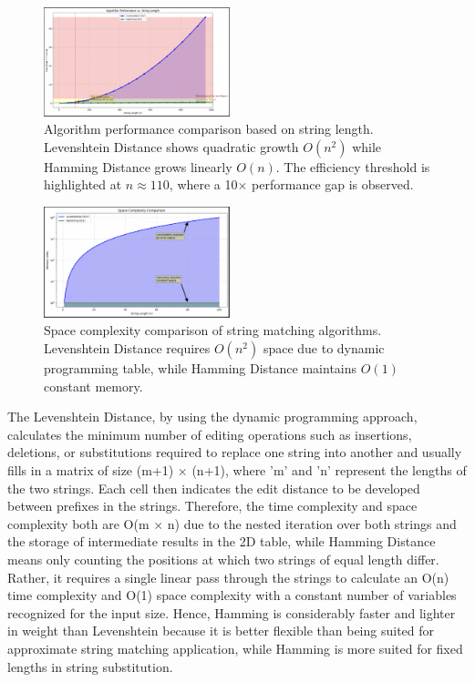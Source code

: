 \documentclass[conference]{IEEEtran}
\begin{document}
\begin{figure}[htbp]
\centering
\includegraphics[width=0.48\textwidth]{performance_graph.png}
\caption{Algorithm performance comparison based on string length. Levenshtein Distance shows quadratic growth $O(n^2)$ while Hamming Distance grows linearly $O(n)$. The efficiency threshold is highlighted at $n \approx 110$, where a 10× performance gap is observed.}
\label{fig:performance-comparison}
\end{figure}

\begin{figure}[htbp]
\centering
\includegraphics[width=0.48\textwidth]{space_complexity.png}
\caption{Space complexity comparison of string matching algorithms. Levenshtein Distance requires $O(n^2)$ space due to dynamic programming table, while Hamming Distance maintains $O(1)$ constant memory.}
\label{fig:space-comparison}
\end{figure}


The Levenshtein Distance, by using the dynamic programming approach, calculates the minimum number of editing operations such as insertions, deletions, or substitutions required to replace one string into another and usually fills in a matrix of size (m+1) × (n+1), where 'm' and 'n' represent the lengths of the two strings. Each cell then indicates the edit distance to be developed between prefixes in the strings. Therefore, the time complexity and space complexity both are O(m × n) due to the nested iteration over both strings and the storage of intermediate results in the 2D table, while Hamming Distance means only counting the positions at which two strings of equal length differ. Rather, it requires a single linear pass through the strings to calculate an O(n) time complexity and O(1) space complexity with a constant number of variables recognized for the input size. Hence, Hamming is considerably faster and lighter in weight than Levenshtein because it is better flexible than being suited for approximate string matching application, while Hamming is more suited for fixed lengths in string substitution.
\end{document}
